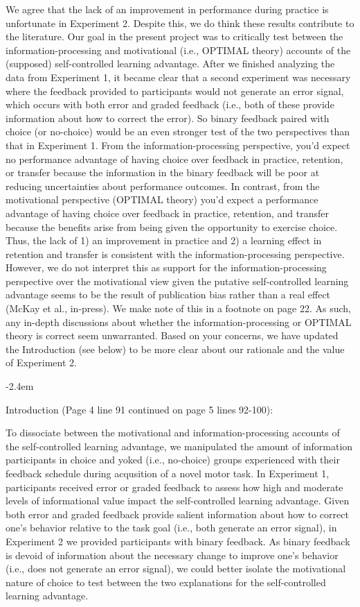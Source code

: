 \documentclass[final]{article}
\renewenvironment{quote}{\begin{fquote}\advance\leftmargini -2.4em\begin{oldquote}}{\end{oldquote}\end{fquote}}
\newenvironment{fquote}
  {\def\FrameCommand{
	\fboxsep=0.6em %
	\fcolorbox{black}{white}}%
    \MakeFramed {\advance\hsize-2\width \FrameRestore}
    \begin{minipage}{\linewidth}
  }
  {\end{minipage}\endMakeFramed}
\begin{document}
We agree that the lack of an improvement in performance during practice is unfortunate in Experiment 2. Despite this, we do think these results contribute to the literature. Our goal in the present project was to critically test between the information-processing and motivational (i.e., OPTIMAL theory) accounts of the (supposed) self-controlled learning advantage. After we finished analyzing the data from Experiment 1, it became clear that a second experiment was necessary where the feedback provided to participants would not generate an error signal, which occurs with both error and graded feedback (i.e., both of these provide information about how to correct the error). So binary feedback paired with choice (or no-choice) would be an even stronger test of the two perspectives than that in Experiment 1. From the information-processing perspective, you'd expect no performance advantage of having choice over feedback in practice, retention, or transfer because the information in the binary feedback will be poor at reducing uncertainties about performance outcomes. In contrast, from the motivational perspective (OPTIMAL theory) you'd expect a performance advantage of having choice over feedback in practice, retention, and transfer because the benefits arise from being given the opportunity to exercise choice. Thus, the lack of 1) an improvement in practice and 2) a learning effect in retention and transfer is consistent with the information-processing perspective. However, we do not interpret this as support for the information-processing perspective over the motivational view given the putative self-controlled learning advantage seems to be the result of publication bias rather than a real effect (McKay et al., in-press). We make note of this in a footnote on page 22. As such, any in-depth discussions about whether the information-processing or OPTIMAL theory is correct seem unwarranted. Based on your concerns, we have updated the Introduction (see below) to be more clear about our rationale and the value of Experiment 2.

\begin{quote}
Introduction (Page 4 line 91 continued on page 5 lines 92-100):

To dissociate between the motivational and information-processing accounts of the self-controlled learning advantage, we manipulated the amount of information participants in choice and yoked (i.e., no-choice) groups experienced with their feedback schedule during acqusition of a novel motor task. In Experiment 1, participants received error or graded feedback to assess how high and moderate levels of informational value impact the self-controlled learning advantage. Given both error and graded feedback provide salient information about how to correct one's behavior relative to the task goal (i.e., both generate an error signal), in Experiment 2 we provided participants with binary feedback. As binary feedback is devoid of information about the necessary change to improve one's behavior (i.e., does not generate an error signal), we could better isolate the motivational nature of choice to test between the two explanations for the self-controlled learning advantage.
\end{quote}
\end{document}
